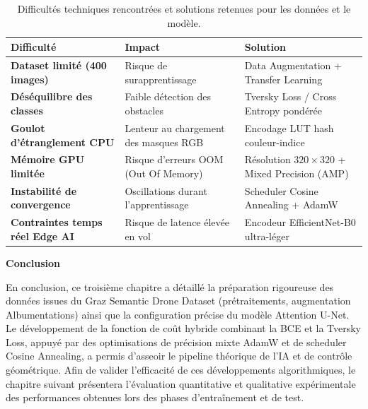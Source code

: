 \begin{table}[!ht]
  \centering
  \caption{Difficultés techniques rencontrées et solutions retenues pour les données et le modèle.}
  \label{tab:difficultes-synthese}
  \renewcommand{\arraystretch}{1.4}
  \begin{tabularx}{0.95\textwidth}{
    >{\bfseries\color{ENIADBlue}}l
    >{\centering\arraybackslash}X
    >{\centering\arraybackslash}X
  }
    \toprule
    \rowcolor{ENIADBlue!12}
    \textbf{Difficulté} & \textbf{Impact} & \textbf{Solution} \\
    \midrule
    Dataset limité (400 images) & Risque de surapprentissage & Data Augmentation + Transfer Learning \\
    \rowcolor{ENIADLightBlue!20}
    Déséquilibre des classes & Faible détection des obstacles & Tversky Loss / Cross Entropy pondérée \\
    Goulot d'étranglement CPU & Lenteur au chargement des masques RGB & Encodage LUT hash couleur-indice \\
    \rowcolor{ENIADLightBlue!20}
    Mémoire GPU limitée & Risque d'erreurs OOM (Out Of Memory) & Résolution $320\times320$ + Mixed Precision (AMP) \\
    Instabilité de convergence & Oscillations durant l'apprentissage & Scheduler Cosine Annealing + AdamW \\
    \rowcolor{ENIADLightBlue!20}
    Contraintes temps réel Edge AI & Risque de latence élevée en vol & Encodeur EfficientNet-B0 ultra-léger \\
    \bottomrule
  \end{tabularx}
\end{table}

\vspace{1.5em}
\textbf{Conclusion}

En conclusion, ce troisième chapitre a détaillé la préparation rigoureuse des données issues du Graz Semantic Drone Dataset (prétraitements, augmentation Albumentations) ainsi que la configuration précise du modèle Attention U-Net. Le développement de la fonction de coût hybride combinant la BCE et la Tversky Loss, appuyé par des optimisations de précision mixte AdamW et de scheduler Cosine Annealing, a permis d'asseoir le pipeline théorique de l'IA et de contrôle géométrique. Afin de valider l'efficacité de ces développements algorithmiques, le chapitre suivant présentera l'évaluation quantitative et qualitative expérimentale des performances obtenues lors des phases d'entraînement et de test.


\clearpage
